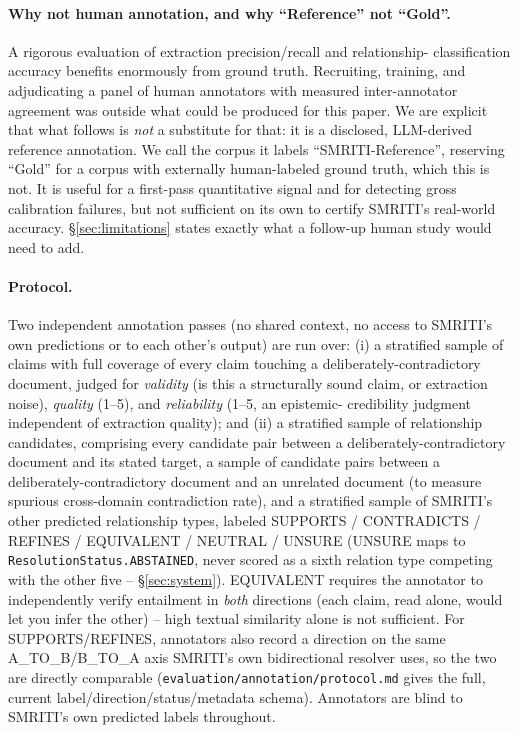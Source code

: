 \paragraph{Why not human annotation, and why ``Reference'' not ``Gold''.}
A rigorous evaluation of extraction precision/recall and relationship-
classification accuracy benefits enormously from ground truth. Recruiting,
training, and adjudicating a panel of human annotators with measured
inter-annotator agreement was outside what could be produced for this
paper. We are explicit that what follows is \emph{not} a substitute for
that: it is a disclosed, LLM-derived reference annotation. We call the
corpus it labels ``SMRITI-Reference'', reserving ``Gold'' for a corpus with
externally human-labeled ground truth, which this is not. It is useful for
a first-pass quantitative signal and for detecting gross calibration
failures, but not sufficient on its own to certify SMRITI's real-world
accuracy. \S\ref{sec:limitations} states exactly what a follow-up human
study would need to add.

\paragraph{Protocol.} Two independent annotation passes (no shared
context, no access to SMRITI's own predictions or to each other's output)
are run over: (i) a stratified sample of claims with full coverage of
every claim touching a deliberately-contradictory document, judged for
\emph{validity} (is this a structurally sound claim, or extraction noise),
\emph{quality} (1--5), and \emph{reliability} (1--5, an epistemic-
credibility judgment independent of extraction quality); and (ii) a
stratified sample of relationship candidates, comprising every candidate
pair between a deliberately-contradictory document and its stated target,
a sample of candidate pairs between a deliberately-contradictory document
and an unrelated document (to measure spurious cross-domain contradiction
rate), and a stratified sample of SMRITI's other predicted relationship
types, labeled SUPPORTS / CONTRADICTS / REFINES / EQUIVALENT / NEUTRAL /
UNSURE (UNSURE maps to \texttt{ResolutionStatus.ABSTAINED}, never scored
as a sixth relation type competing with the other five --
\S\ref{sec:system}). EQUIVALENT requires the annotator to independently
verify entailment in \emph{both} directions (each claim, read alone,
would let you infer the other) -- high textual similarity alone is not
sufficient. For SUPPORTS/REFINES, annotators also record a direction on
the same A\_TO\_B/B\_TO\_A axis SMRITI's own bidirectional resolver uses,
so the two are directly comparable (\texttt{evaluation/annotation/protocol.md}
gives the full, current label/direction/status/metadata schema).
Annotators are blind to SMRITI's own predicted labels throughout.

